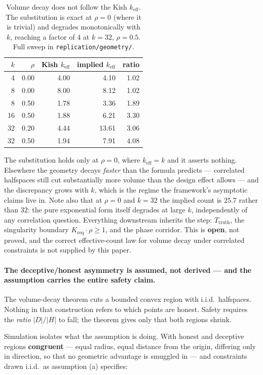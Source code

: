 \documentclass[11pt,a4paper]{article}
\theoremstyle{definition}
\theoremstyle{remark}
\newcommand{\keff}{k_{\text{eff}}}
\newcommand{\Kreq}{K_{\text{req}}}
\newcommand{\Ttruth}{T_{\text{truth}}}
\begin{document}
\begin{table}[H]
\centering
\begin{tabular}{rrrrr}
\toprule
$k$ & $\rho$ & Kish $\keff$ & implied $\keff$ & ratio \\
\midrule
 4 & 0.00 &  4.00 &  4.10 & 1.02 \\
 8 & 0.00 &  8.00 &  8.12 & 1.02 \\
 8 & 0.50 &  1.78 &  3.36 & 1.89 \\
16 & 0.50 &  1.88 &  6.21 & 3.30 \\
32 & 0.20 &  4.44 & 13.61 & 3.06 \\
32 & 0.50 &  1.94 &  7.91 & 4.08 \\
\bottomrule
\end{tabular}
\caption{Volume decay does not follow the Kish $\keff$. The substitution is exact at $\rho = 0$ (where it is trivial) and degrades monotonically with $k$, reaching a factor of 4 at $k=32$, $\rho=0.5$. Full sweep in \texttt{replication/geometry/}.}
\end{table}

The substitution holds only at $\rho = 0$, where $\keff = k$ and it asserts nothing. Elsewhere
the geometry decays \emph{faster} than the formula predicts --- correlated halfspaces still cut
substantially more volume than the design effect allows --- and the discrepancy grows with $k$,
which is the regime the framework's asymptotic claims live in. Note also that at $\rho = 0$ and
$k = 32$ the implied count is $25.7$ rather than $32$: the pure exponential form itself degrades
at large $k$, independently of any correlation question. Everything downstream inherits the
step: $\Ttruth$, the singularity boundary $\Kreq \cdot \rho \geq 1$, and the phase corridor.
This is \textbf{open}, not proved, and the correct effective-count law for volume decay under
correlated constraints is not supplied by this paper.

\paragraph{The deceptive/honest asymmetry is assumed, not derived --- and the assumption carries the entire safety claim.}
The volume-decay theorem cuts a bounded convex region with i.i.d.\ halfspaces. Nothing in that
construction refers to which points are honest. Safety requires the \emph{ratio}
$|D|/|H|$ to fall; the theorem gives only that both regions shrink.

Simulation isolates what the assumption is doing. With honest and deceptive regions
\textbf{congruent} --- equal radius, equal distance from the origin, differing only in
direction, so that no geometric advantage is smuggled in --- and constraints drawn i.i.d.\ as
assumption (a) specifies:
\end{document}
